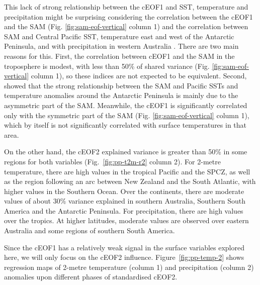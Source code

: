 \documentclass[pdflatex,lineno,sn-basic]{sn-jnl}
\theoremstyle{thmstyleone}%
\theoremstyle{thmstyletwo}%
\theoremstyle{thmstylethree}%
\begin{document}
This lack of strong relationship between the cEOF1 and SST, temperature and precipitation might be surprising considering the correlation between the cEOF1 and the SAM (Fig. \ref{fig:sam-eof-vertical} column 1) and the correlation between SAM and Central Pacific SST, temperature east and west of the Antarctic Peninsula, and with precipitation in western Australia \citep{fogt2020}.
There are two main reasons for this.
First, the correlation between cEOF1 and the SAM in the troposphere is modest, with less than 50\% of shared variance (Fig. \ref{fig:sam-eof-vertical} column 1), so these indices are not expected to be equivalent.
Second, \citet{campitelli2022} showed that the strong relationship between the SAM and Pacific SSTs and temperature anomalies around the Antarctic Peninsula is mainly due to the asymmetric part of the SAM.
Meanwhile, the cEOF1 is significantly correlated only with the symmetric part of the SAM (Fig. \ref{fig:sam-eof-vertical} column 1), which by itself is not significantly correlated with surface temperatures in that area.

On the other hand, the cEOF2 explained variance is greater than 50\% in some regions for both variables (Fig.~\ref{fig:pp-t2m-r2} column 2).
For 2-metre temperature, there are high values in the tropical Pacific and the SPCZ, as well as the region following an arc between New Zealand and the South Atlantic, with higher values in the Southern Ocean.
Over the continents, there are moderate values of about 30\% variance explained in southern Australia, Southern South America and the Antarctic Peninsula.
For precipitation, there are high values over the tropics. At higher latitudes, moderate values are observed over eastern Australia and some regions of southern South America.

Since the cEOF1 has a relatively weak signal in the surface variables explored here, we will only focus on the cEOF2 influence.
Figure~\ref{fig:pp-temp-2} shows regression maps of 2-metre temperature (column 1) and precipitation (column 2) anomalies upon different phases of standardised cEOF2.
\end{document}
